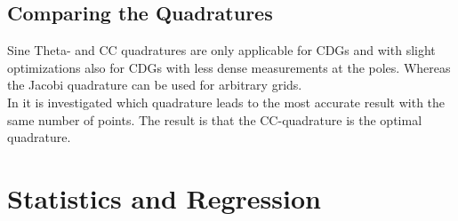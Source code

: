 \subsection{Comparing the Quadratures}

Sine Theta- and \ac{CC} quadratures are only applicable for \acp{CDG} and with slight optimizations also for \acp{CDG} with less dense measurements at the poles. Whereas the Jacobi quadrature can be used for arbitrary grids.\\
In \cite{trp2} it is investigated which quadrature leads to the most accurate result with the same number of points. The result is that the \ac{CC}-quadrature is the optimal quadrature.

\section{Statistics and Regression}